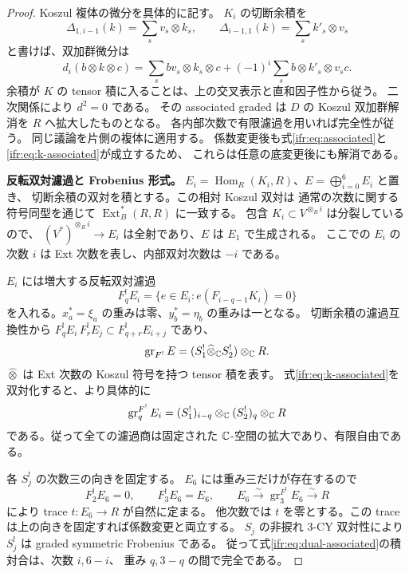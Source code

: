 \begin{proof}
Koszul 複体の微分を具体的に記す。
$K_i$ の切断余積を
\[
 \Delta_{1,i-1}(k)=\sum_s v_s\otimes k_s,\qquad
 \Delta_{i-1,1}(k)=\sum_s k'_s\otimes v_s
\]
と書けば、双加群微分は
\begin{equation}\label{ifr:eq:koszul-differential}
 d_i(b\otimes k\otimes c)=
  \sum_s bv_s\otimes k_s\otimes c
       +(-1)^i\sum_s b\otimes k'_s\otimes v_sc.
\end{equation}
余積が $K$ の tensor 積に入ることは、上の交叉表示と直和因子性から従う。
二次関係により $d^2=0$ である。
その associated graded は $D$ の Koszul 双加群解消を $R$ へ拡大したものとなる。
各内部次数で有限濾過を用いれば完全性が従う。
同じ議論を片側の複体に適用する。
係数変更後も式\eqref{ifr:eq:associated}と\eqref{ifr:eq:k-associated}が成立するため、
これらは任意の底変更後にも解消である。

\textbf{反転双対濾過と Frobenius 形式。}
$E_i=\operatorname{Hom}_R(K_i,R)$、$E=\bigoplus_{i=0}^6E_i$ と置き、
切断余積の双対を積とする。この相対 Koszul 双対は
通常の次数に関する符号同型を通じて
$\operatorname{Ext}_B^*(R,R)$ に一致する。
包含 $K_i\subset V^{\otimes_Ri}$ は分裂しているので、
$(V^*)^{\otimes_R i}\to E_i$ は全射であり、$E$ は $E_1$ で生成される。
ここでの $E_i$ の次数 $i$ は Ext 次数を表し、内部双対次数は $-i$ である。

$E_i$ には増大する反転双対濾過
\begin{equation}\label{ifr:eq:dual-filtration}
 F^!_qE_i=\{e\in E_i:e(F_{i-q-1}K_i)=0\}
\end{equation}
を入れる。$x_a^*=\xi_a$ の重みは零、$y_b^*=\eta_b$ の重みは一となる。
切断余積の濾過互換性から $F^!_qE_i\,F^!_rE_j\subset F^!_{q+r}E_{i+j}$ であり、
\begin{equation}\label{ifr:eq:dual-associated}
 \operatorname{gr}_{F^!}E
   =(S_1^!\widehat\otimes_\mathbb C S_2^!)\otimes_\mathbb C R.
\end{equation}
$\widehat\otimes$ は Ext 次数の Koszul 符号を持つ tensor 積を表す。
式\eqref{ifr:eq:k-associated}を双対化すると、より具体的に
\[
 \operatorname{gr}_{q}^{F^!}E_i
  =(S_1^!)_{i-q}\otimes_\mathbb C(S_2^!)_q\otimes_\mathbb C R
\]
である。従って全ての濾過商は固定された $\mathbb C$-空間の拡大であり、有限自由である。

各 $S_j^!$ の次数三の向きを固定する。
$E_6$ には重み三だけが存在するので
\[
 F^!_2E_6=0,\qquad F^!_3E_6=E_6,
 \qquad E_6\xrightarrow{\sim}\operatorname{gr}^{F^!}_3E_6\xrightarrow{\sim}R
\]
により trace $t:E_6\to R$ が自然に定まる。
他次数では $t$ を零とする。この trace は上の向きを固定すれば係数変更と両立する。
$S_j$ の非捩れ $3$-CY 双対性により $S_j^!$ は graded symmetric Frobenius である。
従って式\eqref{ifr:eq:dual-associated}の積対合は、次数 $i,6-i$、
重み $q,3-q$ の間で完全である。


\end{proof}
